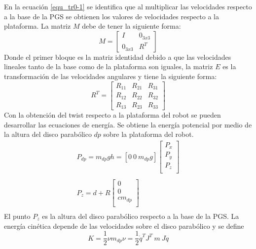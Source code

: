 En la ecuación \ref{equ_tr0-1} se identifica que al multiplicar las velocidades respecto a la base de la PGS se obtienen los valores de velocidades respecto a la plataforma. La matriz $M$ debe de tener la siguiente forma:
\begin{equation}
M = \begin{bmatrix}
I & 0_{3x3} \\
0_{3x3} & R^T
\end{bmatrix}
\end{equation}
Donde el primer bloque es la matriz identidad debido a que las velocidades lineales tanto de la base como de la plataforma son iguales, la matriz $E$ es la transformación de las velocidades angulares y tiene la siguiente forma:
\begin{equation*}
R^T = \begin{bmatrix}
R_{11} & R_{21} & R_{31}\\
R_{12} & R_{22} & R_{32}\\
R_{13} & R_{23} & R_{33}
\end{bmatrix}
\end{equation*}
Con la obtención del twist respecto a la plataforma del robot se pueden desarrollar las ecuaciones de energía. Se obtiene la energía potencial por medio de la altura del disco parabólico $dp$ sobre la plataforma del robot.
\begin{equation}
\begin{split}
P_{dp} = m_{dp}gh = [0\ 0\ m_{dp}g] \begin{bmatrix}
P_x\\
P_y\\
P_z\\
\end{bmatrix}\\
\\
P_z = d + R\begin{bmatrix}
0\\
0\\
cm_{dp}\\
\end{bmatrix}\\
\end{split}
\end{equation}
El punto $P_z$ es la altura del disco parabólico respecto a la base de la PGS. La energía cinética depende de las velocidades sobre el disco parabólico y se define
\begin{equation}
K = \frac{1}{2} \nu m_{dp} \nu = \frac{1}{2} \dot{q}^T J^T\ m\ J \dot{q}
\end{equation}
